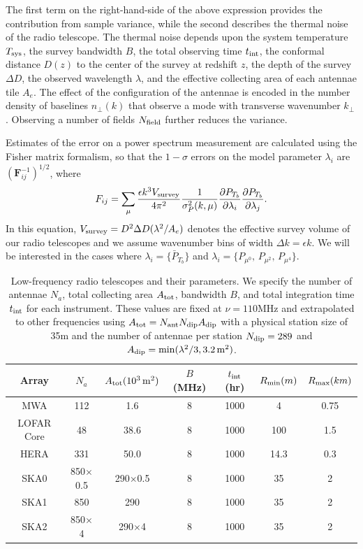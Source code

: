 \documentclass{PoS}
\begin{document}
The first term on the right-hand-side
of the above expression provides the contribution from sample variance,
while the second describes the thermal noise of the radio telescope.  The
thermal noise depends upon the system temperature $T_{\rm sys}$, the survey
bandwidth $B$, the total observing time $t_{\rm int}$, the conformal
distance $D(z)$ to the center of the survey at redshift $z$, the depth of
the survey $\Delta D$, the observed wavelength $\lambda$, and the effective
collecting area of each antennae tile $A_e$.  The effect of the
configuration of the antennae is encoded in the number density of baselines
$n_\perp(k)$ that observe a mode with transverse wavenumber $k_\perp$
\citep{2006ApJ...653..815M}.  Observing a number of fields $N_{\rm field}$ further reduces the variance.

Estimates of the error on a power spectrum measurement are calculated using the Fisher matrix formalism, so that the $1-\sigma$ errors on the model parameter $\lambda_i$ are $(\mathbf{F}_{ij}^{-1})^{1/2}$, where 
\begin{equation}
F_{ij}=\sum_{\rm \mu} \frac{\epsilon k^3 V_{\rm survey}}{4\pi^2}\frac{1}{\sigma_P^2(k,\mu)}\frac{\partial P_{T_b}}{\partial \lambda_i}\frac{\partial P_{T_b}}{\partial \lambda_j}.
\end{equation}
In this equation, $V_{\rm survey}=D^2\Delta D(\lambda^2/A_e)$ denotes the
effective survey volume of our radio telescopes and we assume wavenumber
bins of width $\Delta k=\epsilon k$.  We will be interested in the cases
where $\lambda_i=\{\bar{P}_{T_b}\}$ and $\lambda_i=\{
P_{\mu^0},\,P_{\mu^2},\,P_{\mu^4}\}$.

\begin{table}[htdp]
\caption{Low-frequency radio telescopes and their parameters.  We specify the number of antennae $N_a$, total collecting area $A_{\rm tot}$, bandwidth $B$, and total integration time $t_{\rm int}$ for each instrument. These values are fixed at $\nu=110$MHz and extrapolated to other frequencies using $A_{\rm tot}=N_{\rm ant}N_{\rm dip}A_{\rm dip}$ with a physical station size of 35m and the number of antennae per station $N_{\rm dip}=289$ and $A_{\rm dip}=\min(\lambda^2/3,3.2\,{ \rm m^2})$.}
\begin{center}
\begin{tabular}{ccccccc}
\hline
\hline
Array & $N_a$ & $A_{\rm tot}(10^3\,{\rm m^2})$ & $B$ (MHz) & $t_{\rm int}$ (hr)& $R_{\rm min} (m)$ & $R_{\rm max} (km)$\\
\hline
MWA & 112 & 1.6  & 8 & 1000 & 4 & 0.75\\
LOFAR Core & 48 & 38.6  & 8 & 1000 & 100 & 1.5\\
HERA & 331 & 50.0  & 8 & 1000 & 14.3 & 0.3\\
SKA0 & 850$\times$0.5 & 290$\times$0.5  & 8 & 1000 & 35 & 2\\
SKA1 & 850 & 290  & 8 & 1000 & 35 & 2\\
SKA2 & 850$\times$4 & 290$\times$4 & 8 & 1000 & 35 & 2\\
\hline
\hline
\end{tabular}
\end{center}
\label{tab:telescopes}
\end{table}%
\end{document}
